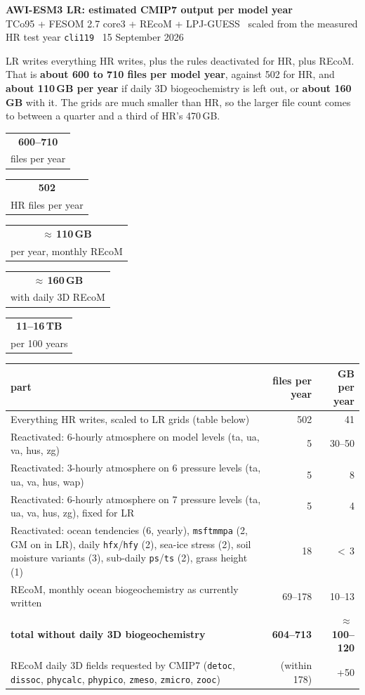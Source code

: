 \documentclass[10pt,a4paper]{article}
\makeatletter
\newcommand{\sect}[1]{\vspace{6pt}{\color{accent}\large\bfseries #1}\par\vspace{1pt}}
\newcommand{\code}[1]{\texttt{\small #1}}
\newcommand{\keyfig}[2]{\begin{tabular}[t]{@{}c@{}}{\color{accent}\Large\bfseries #1}\\[-1pt]{\footnotesize #2}\end{tabular}}
\makeatother
\begin{document}
{\color{accent}\LARGE\bfseries AWI-ESM3 LR: estimated CMIP7 output per model year}\\[2pt]
{\small TCo95 + FESOM 2.7 core3 + REcoM + LPJ-GUESS \textbar\ scaled from the measured HR test year \code{cli119} \textbar\ 15 September 2026}

\sect{Result}
LR writes everything HR writes, plus the rules deactivated for HR, plus REcoM. That is \textbf{about 600 to 710
files per model year}, against 502 for HR, and \textbf{about 110\,GB per year} if daily 3D biogeochemistry is
left out, or \textbf{about 160\,GB} with it. The grids are much smaller than HR, so the larger file count
comes to between a quarter and a third of HR's 470\,GB.

\vspace{2pt}
\begin{center}
\keyfig{600--710}{files per year}\hfill
\keyfig{502}{HR files per year}\hfill
\keyfig{$\approx$\,110\,GB}{per year, monthly REcoM}\hfill
\keyfig{$\approx$\,160\,GB}{with daily 3D REcoM}\hfill
\keyfig{11--16\,TB}{per 100 years}
\end{center}

\sect{What LR writes}
\begin{tabularx}{\linewidth}{@{}Xrr@{}}
\toprule
\textbf{part} & \textbf{files per year} & \textbf{GB per year} \\
\midrule
Everything HR writes, scaled to LR grids (table below) & 502 & 41 \\
Reactivated: 6-hourly atmosphere on model levels (ta, ua, va, hus, zg) & 5 & 30--50 \\
Reactivated: 3-hourly atmosphere on 6 pressure levels (ta, ua, va, hus, wap) & 5 & 8 \\
Reactivated: 6-hourly atmosphere on 7 pressure levels (ta, ua, va, hus, zg), fixed for LR & 5 & 4 \\
Reactivated: ocean tendencies (6, yearly), \code{msftmmpa} (2, GM on in LR), daily \code{hfx}/\code{hfy} (2),
sea-ice stress (2), soil moisture variants (3), sub-daily \code{ps}/\code{ts} (2), grass height (1) & 18 & $<$\,3 \\
REcoM, monthly ocean biogeochemistry as currently written & 69--178 & 10--13 \\
\midrule
\textbf{total without daily 3D biogeochemistry} & \textbf{604--713} & \textbf{$\approx$\,100--120} \\
REcoM daily 3D fields requested by CMIP7 (\code{detoc}, \code{dissoc}, \code{phycalc}, \code{phypico}, \code{zmeso}, \code{zmicro}, \code{zooc}) & (within 178) & +50 \\
\bottomrule
\end{tabularx}
\end{document}
